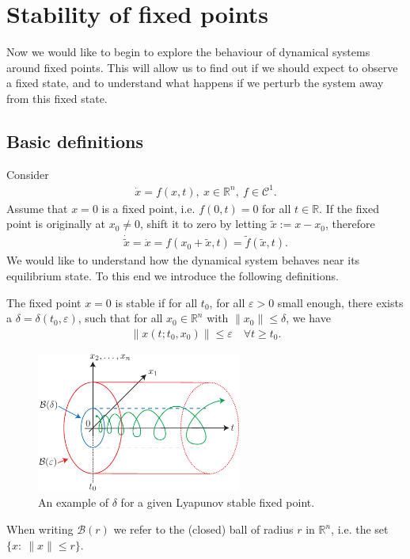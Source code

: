 \chapter{Stability of fixed points}
Now we would like to begin to explore the behaviour of dynamical systems around fixed points. This will allow us to find out if we should expect to observe a fixed state, and to understand what happens if we perturb the system away from this fixed state.
\section{Basic definitions}
Consider
\begin{align}
	\dot{ {x}}=f( {x},t),\  {x} \in \mathbb{R}^{n},\ f\in \mathcal{C}^{1}.
\end{align}
Assume that $ {x}=0$ is a fixed point, i.e. $f({0},t) = {0}$ for all $t \in \mathbb{R}$. If the fixed point is originally at ${x}_0\neq {0}$, shift it to zero by letting $\tilde{ {x}}:= {x}- {x}_0$, therefore 
\begin{align}
	\dot{\tilde{ {x}}} = \dot{ {x}} = f( {x}_0 + \tilde{ {x}}, t) = \tilde{f}(\tilde{ {x}}, t).
\end{align}
We would like to understand how the dynamical system behaves near its equilibrium state. To this end we introduce the following definitions.
\begin{definition} \label{def:stable}
	The fixed point $ {x}={0}$ is stable if for all $t_0$, for all $\varepsilon>0$ small enough, there exists a $\delta=\delta(t_0, \varepsilon)$, such that for all $ {x}_0 \in \mathbb{R}^{n}$ with $\| {x}_0\| \leq \delta$, we have 
	\begin{align}
		\boxed{
			\left \|  {x}(t;t_0,  {x}_0) \right\| \leq \varepsilon \quad \forall t \geq t_0.
		}
	\end{align}
\begin{figure}[h!]
	\centering
	\includegraphics[width=0.6\textwidth]{figures/ch2/1lyapunov_stability.pdf}
	\caption{An example of $\delta$ for a given Lyapunov stable fixed point.}
	\label{fig:lyapunov_stability_def}
\end{figure}
\end{definition}
\begin{remark}
	When writing $\mathcal{B}(r)$ we refer to the (closed) ball of radius $r$ in $\mathbb{R}^{n}$, i.e. the set $\{x:\ \|x\| \leq r\}$.
\end{remark}

